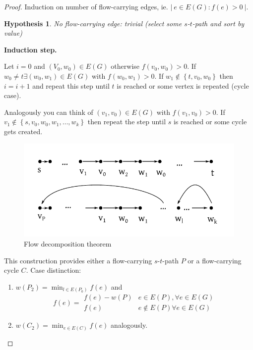 \documentclass{article}
\newtheorem*{hypothesis}{Hypothesis}
\newcommand{\card}[1]{\left|\:\!#1\:\!\right|}
\newcommand{\set}[1]{\left\{#1\right\}}
\newcommand{\gath}[2]{$#1$-$#2$-path} %
\begin{document}
\begin{proof}
  Induction on number of flow-carrying edges, ie. $\card{ e \in E(G): f(e) > 0 }$. \\
  \begin{hypothesis}
    No flow-carrying edge: trivial (select some \gath st and sort by value)
  \end{hypothesis}
  \textbf{Induction step.}

  Let $i=0$ and $(V_0, w_0) \in E(G)$ otherwise $f(v_0, w_0) > 0$.
  If $w_0 \neq t \exists (w_0, w_1) \in E(G)$ with $f(w_0, w_1) > 0$.
  If $w_1 \notin \set{t, v_0, w_0}$ then $i = i + 1$ and repeat this step until $t$ is reached or some vertex is repeated (cycle case).

  Analogously you can think of $(v_1, v_0) \in E(G)$ with $f(v_1, v_0) > 0$. If $v_1 \notin \set{s, v_0, w_0, w_1, \ldots, w_k}$ then repeat the step until $s$ is reached or some cycle gets created.

  \begin{figure}[ht]
   \begin{center}
    \includegraphics{img/flow_decomposition_theorem.pdf}
    \caption{Flow decomposition theorem}
   \end{center}
  \end{figure}

  This construction provides either a flow-carrying \gath st $P$ or a flow-carrying cycle $C$. Case distinction:
  \begin{enumerate}
    \item $w(P_2) = \min_{l \in E(P_0)} f(e)$ and \[
          f(e) = \begin{array}{lc}
            f(e) - w(P)  & e \in E(P), \forall e \in E(G) \\
            f(e)         & e \notin E(P) \forall e \in E(G)
          \end{array}\]
    \item $w(C_2) = \min_{e \in E(C)} f(e)$ analogously.
  \end{enumerate}


\end{proof}
\end{document}
